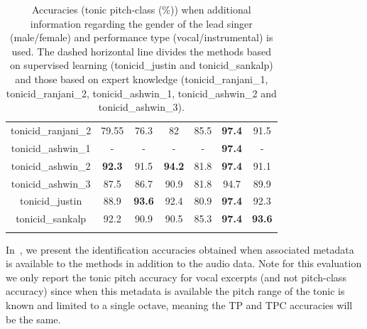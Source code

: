 {\begin{table}
\begin{centering}
\begin{tabular}{ c | c  c  c  c  c  c }
		\acrshort{tonicid_ranjani_2} & 79.55 & 76.3 & 82 & 85.5 & \textbf{97.4} & 91.5 \\
		
		\acrshort{tonicid_ashwin_1} & - & - &- & - & \textbf{97.4} & - \\
		
		\acrshort{tonicid_ashwin_2} & \textbf{92.3} & 91.5 & \textbf{94.2} & 81.8 & \textbf{97.4} & 91.1 \\
		
		\acrshort{tonicid_ashwin_3} & 87.5 & 86.7 & 90.9 & 81.8 & 94.7 & 89.9 \\
		\hdashline
		\acrshort{tonicid_justin} & 88.9 & \textbf{93.6} & 92.4 & 80.9 & \textbf{97.4} & 92.3 \\
		
		\acrshort{tonicid_sankalp} & 92.2 & 90.9 & 90.5 & 85.3 & \textbf{97.4} & \textbf{93.6}  \\		
\tablebot		
	\end{tabular}
\par	\end{centering}
	\caption[Tonic identification accuracies of seven methods on six different datasets using both audio and editorial metadata]{Accuracies (tonic pitch-class (\%)) when additional information regarding the gender of the lead singer (male/female) and performance type (vocal/instrumental) is used. The dashed horizontal line divides the methods based on supervised learning (\acrshort{tonicid_justin} and \acrshort{tonicid_sankalp}) and those based on expert knowledge (\acrshort{tonicid_ranjani_1}, \acrshort{tonicid_ranjani_2}, \acrshort{tonicid_ashwin_1}, \acrshort{tonicid_ashwin_2} and \acrshort{tonicid_ashwin_3}).}
	\label{tab:tonic_identification_accuracy_with_gender_info}
\end{table}

In~, we present the identification accuracies obtained when associated metadata is available to the methods in addition to the audio data. Note for this evaluation we only report the tonic pitch
accuracy for vocal excerpts (and not pitch-class accuracy) since when this metadata is available the pitch range of the tonic is known and limited to a
single octave, meaning the TP and TPC accuracies will be the same.

}
